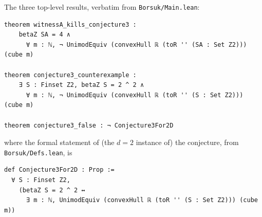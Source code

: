 \documentclass[11pt]{article}
\theoremstyle{remark}
\begin{document}
\noindent The three top-level results, verbatim from
\texttt{Borsuk/Main.lean}:

\begin{lstlisting}
theorem witnessA_kills_conjecture3 :
    betaZ SA = 4 ∧
      ∀ m : ℕ, ¬ UnimodEquiv (convexHull ℝ (toR '' (SA : Set Z2))) (cube m)

theorem conjecture3_counterexample :
    ∃ S : Finset Z2, betaZ S = 2 ^ 2 ∧
      ∀ m : ℕ, ¬ UnimodEquiv (convexHull ℝ (toR '' (S : Set Z2))) (cube m)

theorem conjecture3_false : ¬ Conjecture3For2D
\end{lstlisting}

\noindent where the formal statement of (the $d = 2$ instance of) the
conjecture, from \texttt{Borsuk/Defs.lean}, is

\begin{lstlisting}
def Conjecture3For2D : Prop :=
  ∀ S : Finset Z2,
    (betaZ S = 2 ^ 2 ↔
      ∃ m : ℕ, UnimodEquiv (convexHull ℝ (toR '' (S : Set Z2))) (cube m))
\end{lstlisting}
\end{document}
